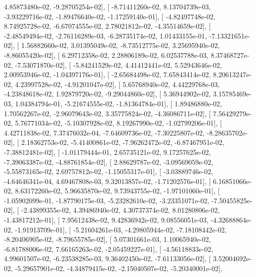 \documentclass{article}
\begin{document}
          4.85873480e-02,  -9.28705254e-02],
       [ -8.71411260e-02,   8.13704739e-03,  -3.93229716e-02,
         -1.89476640e-02,  -1.17259140e-01],
       [ -4.82497748e-02,   8.74925728e-02,  -6.67074555e-02,
          2.78021812e-02,  -4.35514659e-02],
       [ -2.48549494e-02,  -2.76116289e-03,  -6.28735174e-02,
          1.01433155e-01,  -7.13321651e-02],
       [  1.56882660e-02,   3.01395049e-02,  -8.73512775e-02,
          3.25695940e-02,  -8.86055420e-02],
       [  6.29712358e-02,   2.28806189e-02,   6.02537788e-03,
          8.37468727e-02,  -7.53071870e-02],
       [ -5.84241529e-02,   4.41412441e-02,   5.52943646e-02,
          2.00953946e-02,  -1.04397176e-01],
       [ -2.65684498e-02,   7.65843414e-02,   8.20613247e-02,
          4.23997528e-02,  -4.91201047e-02],
       [  5.65768940e-02,   4.44229768e-03,  -4.23848618e-02,
          1.92879720e-02,  -9.29044860e-02],
       [  5.36944902e-02,   3.15785469e-03,   1.04384794e-01,
         -5.21674555e-02,  -1.81364784e-01],
       [  1.89486880e-02,   1.70562267e-02,  -2.96079643e-02,
          3.35775824e-02,  -4.36086711e-02],
       [  7.56429279e-02,   5.76771034e-02,  -5.10307928e-02,
          8.19267990e-02,  -1.02799206e-01],
       [  4.42711838e-02,   7.37476032e-04,  -7.64609736e-02,
         -7.30225807e-02,  -8.28635702e-02],
       [  2.18362753e-02,  -5.41400861e-02,  -7.96262472e-02,
         -6.87467951e-02,  -7.38812481e-02],
       [ -1.01179444e-01,   2.65735121e-02,   9.17257625e-02,
         -7.39063387e-02,  -4.88761854e-02],
       [  2.88629787e-02,  -3.09569059e-02,  -5.55873165e-02,
          2.69757812e-02,  -1.15055317e-01],
       [ -3.03889746e-02,  -4.64646341e-04,   4.69467808e-03,
          9.32013857e-02,  -1.71202576e-01],
       [  6.16851066e-02,   8.63172260e-02,   5.96635870e-02,
          9.73943755e-02,  -1.97101060e-01],
       [ -1.05902099e-01,  -1.87790175e-03,  -5.23282610e-02,
         -3.23351071e-02,  -7.50455825e-02],
       [ -2.43899355e-02,   4.39486940e-02,   4.30737374e-02,
          8.01280806e-02,  -1.43817212e-01],
       [  7.95612438e-02,   9.42836942e-02,   9.08556051e-03,
         -4.32688864e-02,  -1.91913709e-01],
       [ -5.21604261e-03,  -4.29805944e-02,  -7.18108442e-02,
         -8.20406905e-02,  -8.79655785e-02],
       [  5.07301661e-03,   1.10065940e-02,  -6.81788006e-02,
          7.66165263e-02,  -2.05459227e-01],
       [ -4.56118833e-02,   4.99601507e-02,  -6.23538285e-03,
          9.36402450e-02,  -7.61133056e-02],
       [  3.52004692e-02,  -5.29657901e-02,  -4.34879415e-02,
         -2.15040507e-02,  -5.20340001e-02],
\end{document}
